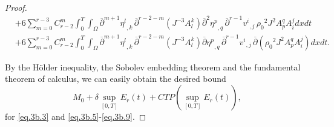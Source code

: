 \documentclass[12pt,twoside,reqno]{amsart}
\numberwithin{equation}{section}
\theoremstyle{definition}
\theoremstyle{remark}
\begin{document}
\begin{proof}
\begin{align}
  &+6\sum_{m=0}^{r-3} C_{r-2}^m{\int_0^T\!\!\!\!\int_\Omega } {{{{\overline{\partial}}^{m+1}\eta^l}}_{,{k}}\,}{\overline{\partial}}^{r-2-m}( J^{-3}A^k_l)  {{{{\overline{\partial}}^2\eta^p}}_{,{q}}\,}{{{{\overline{\partial}}^{r-1} v^i}}_{,{j}}\,}{\rho_0}^2 J^2 A^q_p  A^j_i dxdt\label{eq.3b.8}\\
  &+6\sum_{m=0}^{r-3} C_{r-2}^m{\int_0^T\!\!\!\!\int_\Omega } {{{{\overline{\partial}}^{m+1}\eta^l}}_{,{k}}\,}{\overline{\partial}}^{r-2-m}( J^{-3}A^k_l)  {{{{\overline{\partial}}\eta^p}}_{,{q}}\,}{{{{\overline{\partial}}^{r-1} v^i}}_{,{j}}\,}{\overline{\partial}}\left({\rho_0}^2 J^2 A^q_p  A^j_i\right) dxdt.\label{eq.3b.9}
\end{align}

By the H\"older inequality, the Sobolev embedding theorem and the fundamental theorem of calculus, we can easily obtain the desired bound
$$M_0+\delta \sup_{[0,T]}E_r(t)+CTP(\sup_{[0,T]}E_r(t)),$$
for \eqref{eq.3b.3} and \eqref{eq.3b.5}-\eqref{eq.3b.9}.


\end{proof}
\end{document}

